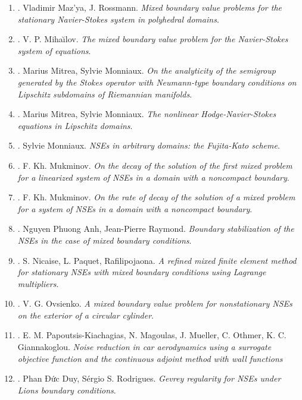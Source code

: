 \documentclass{article}
\begin{document}
\begin{enumerate}
	\item \cite{Mazya_Rossmann2009}. {\sc Vladimir Maz'ya, J. Rossmann}. {\it Mixed boundary value problems for the stationary Navier-Stokes system in polyhedral domains}.
	\item \cite{Mihailov1968}. {\sc V. P. Miha\u{\i}lov}. {\it The mixed boundary value problem for the Navier-Stokes system of equations}.
	\item \cite{Mitrea_Monniaux2008}. {\sc Marius Mitrea, Sylvie Monniaux}. {\it On the analyticity of the semigroup generated by the Stokes operator with Neumann-type boundary conditions on Lipschitz subdomains of Riemannian manifolds}.
	\item \cite{Mitrea_Monniaux2009}. {\sc Marius Mitrea, Sylvie Monniaux}. {\it The nonlinear Hodge-Navier-Stokes equations in Lipschitz domains}.
	\item \cite{Monniaux2006}. {\sc Sylvie Monniaux}. {\it NSEs in arbitrary domains: the Fujita-Kato scheme}.
	\item \cite{Mukminov1992a}. {\sc F. Kh. Mukminov}. {\it On the decay of the solution of the first mixed problem for a linearized system of NSEs in a domain with a noncompact boundary}.
	\item \cite{Mukminov1992b}. {\sc F. Kh. Mukminov}. {\it On the rate of decay of the solution of a mixed problem for a system of NSEs in a domain with a noncompact boundary}.
	\item \cite{Nguyen_Raymond2015}. {\sc Nguyen Phuong Anh, Jean-Pierre Raymond}. {\it Boundary stabilization of the NSEs in the case of mixed boundary conditions}.
	\item \cite{Nicaise_Paquet_Rafilipojaona2007}. {\sc S. Nicaise, L. Paquet, Rafilipojaona}. {\it A refined mixed finite element method for stationary NSEs with mixed boundary conditions using Lagrange multipliers}.
	\item \cite{Ovsienko1978}. {\sc V. G. Ovsienko}. {\it A mixed boundary value problem for nonstationary NSEs on the exterior of a circular cylinder}.
	\item \cite{Papoutsis-Kiachagias_Magoulas_Mueller_Othmer_Giannakoglou2015}. {\sc E. M. Papoutsis-Kiachagias, N. Magoulas, J. Mueller, C. Othmer, K. C. Giannakoglou}. {\it Noise reduction in car aerodynamics using a surrogate objective function and the continuous adjoint method with wall functions}
	\item \cite{Phan_Sergio2017}. {\sc Phan Đức Duy, S\'{e}rgio S. Rodrigues}. {\it Gevrey regularity for NSEs under Lions boundary conditions}.

\end{enumerate}
\end{document}
